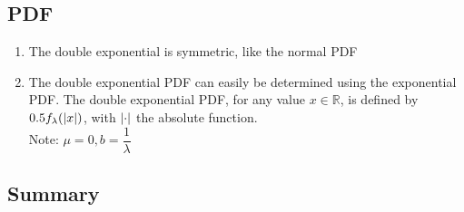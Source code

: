 \subsection{PDF}

\begin{enumerate}
    \item The double exponential is symmetric, like the normal PDF
    \hfill \cite{statistics/book/Statistics-for-Data-Scientists/Maurits-Kaptein}

    \item The double exponential PDF can easily be determined using the exponential PDF. 
    The double exponential PDF, for any value $x \in \mathbb{R}$, is defined by $0.5 f_\lambda (\left| x \right|)$, with $\left| \cdot \right|$ the absolute function.
    \hfill \cite{statistics/book/Statistics-for-Data-Scientists/Maurits-Kaptein}
    \\
    Note: $\mu = 0, b=\dfrac{1}{\lambda}$
    \hfill \cite{common/online/chatgpt}
\end{enumerate}




\subsection{Summary}


